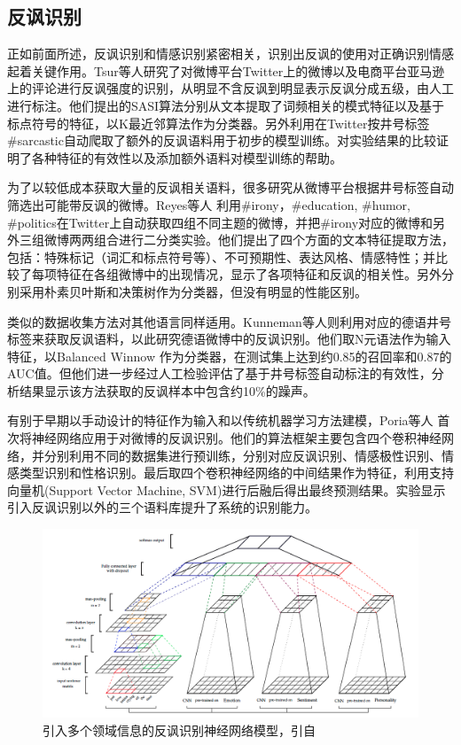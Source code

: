 \subsection{反讽识别}

正如前面所述，反讽识别和情感识别紧密相关，识别出反讽的使用对正确识别情感起着关键作用。Tsur等人\cite{tsur2010icwsm}\cite{davidov2010semi}研究了对微博平台Twitter上的微博以及电商平台亚马逊上的评论进行反讽强度的识别，从明显不含反讽到明显表示反讽分成五级，由人工进行标注。他们提出的SASI算法分别从文本提取了词频相关的模式特征以及基于标点符号的特征，以K最近邻算法作为分类器。另外利用在Twitter按井号标签\#sarcastic自动爬取了额外的反讽语料用于初步的模型训练。对实验结果的比较证明了各种特征的有效性以及添加额外语料对模型训练的帮助。

为了以较低成本获取大量的反讽相关语料，很多研究从微博平台根据井号标签自动筛选出可能带反讽的微博。Reyes等人 \cite{reyes2013multidimensional} 利用\#irony，\#education, \#humor, \#politics在Twitter上自动获取四组不同主题的微博，并把\#irony对应的微博和另外三组微博两两组合进行二分类实验。他们提出了四个方面的文本特征提取方法，包括：特殊标记（词汇和标点符号等）、不可预期性、表达风格、情感特性；并比较了每项特征在各组微博中的出现情况，显示了各项特征和反讽的相关性。另外分别采用朴素贝叶斯和决策树作为分类器，但没有明显的性能区别。

类似的数据收集方法对其他语言同样适用。Kunneman等人\cite{kunneman2015signaling}则利用对应的德语井号标签来获取反讽语料，以此研究德语微博中的反讽识别。他们取N元语法作为输入特征，以Balanced Winnow \cite{littlestone1988learning}作为分类器，在测试集上达到约0.85的召回率和0.87的AUC值。但他们进一步经过人工检验评估了基于井号标签自动标注的有效性，分析结果显示该方法获取的反讽样本中包含约10\%的躁声。

有别于早期以手动设计的特征作为输入和以传统机器学习方法建模，Poria等人 \cite{poria2016deeper} 首次将神经网络应用于对微博的反讽识别。他们的算法框架主要包含四个卷积神经网络，并分别利用不同的数据集进行预训练，分别对应反讽识别、情感极性识别、情感类型识别和性格识别。最后取四个卷积神经网络的中间结果作为特征，利用支持向量机(Support Vector Machine, SVM)进行后融后得出最终预测结果。实验显示引入反讽识别以外的三个语料库提升了系统的识别能力。

\begin{figure}[H] %
  \centering
  \includegraphics[width=\textwidth]{img/poria2016deeper.png}
  \caption{引入多个领域信息的反讽识别神经网络模型，引自\cite{poria2016deeper}}
  \label{fig:poria2016deeper}
\end{figure}

